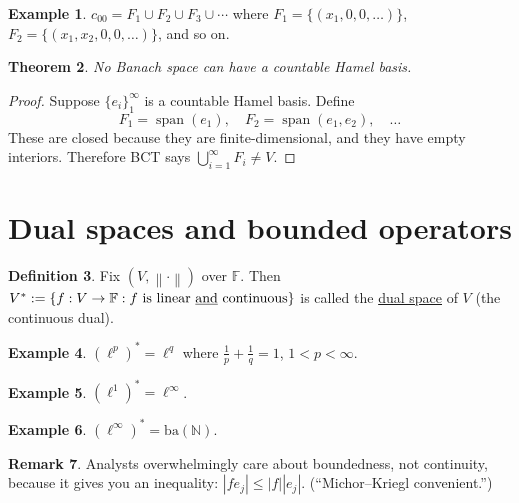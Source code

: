 \documentclass[12pt]{article}
\DeclareMathOperator{\spn}{span}
\newcommand{\abs}[1]{\left| #1 \right|}
\newcommand{\norm}[1]{\left\| #1 \right\|}
\newcommand{\N}{\mathbb{N}}
\newcommand{\F}{\mathbb{F}}
\newtheorem{thm}{Theorem}[section]
\theoremstyle{definition}
\newtheorem{defn}[thm]{Definition}
\newtheorem{ex}[thm]{Example}
\newtheorem{rmk}[thm]{Remark}
\begin{document}
\begin{ex}
	$c_{00} = F_1 \cup F_2 \cup F_3 \cup \cdots$ where $F_1 = \lbrace (x_1, 0, 0, \dots) \rbrace$, $F_2 = \lbrace (x_1, x_2, 0, 0, \dots) \rbrace$, and so on.
\end{ex}

\begin{thm}
	No Banach space can have a countable Hamel basis.
\end{thm}
\begin{proof}
	Suppose $\lbrace e_i \rbrace_1^\infty$ is a countable Hamel basis.
	Define
	\begin{equation*}
		F_1 = \spn(e_1), \quad F_2 = \spn(e_1, e_2), \quad \dots
	\end{equation*}
	These are closed because they are finite-dimensional, and they have
	empty interiors.
	Therefore BCT says $\bigcup_{i=1}^\infty F_i \neq V$.
\end{proof}

\section{Dual spaces and bounded operators}

\begin{defn}
	Fix $(V, \norm{\cdot})$ over $\F$.
	Then $V^* := \lbrace f : V \to \F : f \text{ is linear \underline{and} continuous} \rbrace$ is called the \underline{dual space} of $V$ (the continuous dual).
\end{defn}

\begin{ex}
	$(\ell^p)^* = \ell^q$ where $\frac{1}{p} + \frac{1}{q} = 1$, $1 < p < \infty$.
\end{ex}

\begin{ex}
	$(\ell^1)^* = \ell^\infty$.
\end{ex}

\begin{ex}
	$(\ell^\infty)^* = \mathrm{ba}(\N)$.
\end{ex}

\begin{rmk}
	Analysts overwhelmingly care about boundedness, not continuity, because it gives you an inequality: $\abs{f e_j} \leq \abs{f} \abs{e_j}$.
	(``Michor--Kriegl convenient.'')
\end{rmk}
\end{document}
